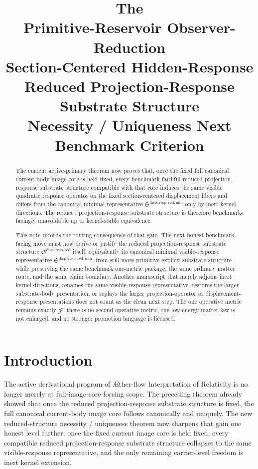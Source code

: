 \documentclass[11pt]{article}
\title{\textbf{The \TheoryName{}}\\[0.4em]
\large Primitive-Reservoir Observer-Reduction\\
\large Section-Centered Hidden-Response\\
\large Reduced Projection-Response Substrate Structure\\
\large Necessity / Uniqueness Next Benchmark Criterion}
\author{}
\date{}
\newcommand{\Aflow}{\AE{}ther-flow}
\newcommand{\TheoryName}{\Aflow{} Interpretation of Relativity}
\newcommand{\CompletedMetric}{g^{\sharp}}
\newcommand{\ReducedStructure}{\mathfrak S^{\mathrm{disp,resp,red}}}
\newcommand{\MinimalReducedStructure}{\mathfrak S^{\mathrm{disp,resp,red,min}}}
\begin{document}
\maketitle

\begin{abstract}
The current active-primary theorem now proves that, once the fixed full canonical current-body image core is held fixed, every benchmark-faithful reduced projection-response substrate structure compatible with that core induces the same visible quadratic response operator on the fixed section-centered displacement fibers and differs from the canonical minimal representative \(\MinimalReducedStructure\) only by inert kernel directions. The reduced projection-response substrate structure is therefore benchmark-facingly unavoidable up to kernel-stable equivalence.

This note records the routing consequence of that gain. The next honest benchmark-facing move must now derive or justify the reduced projection-response substrate structure \(\ReducedStructure\) itself, equivalently its canonical minimal visible-response representative \(\MinimalReducedStructure\), from still more primitive explicit substrate structure while preserving the same benchmark one-metric package, the same ordinary matter route, and the same claim boundary. Another manuscript that merely adjoins inert kernel directions, renames the same visible-response representative, restores the larger substrate-body presentation, or replays the larger projection-operator or displacement-response presentations does not count as the clean next step. The one operative metric remains exactly \(\CompletedMetric\), there is no second operative metric, the low-energy matter law is not enlarged, and no stronger promotion language is licensed.
\end{abstract}

\section{Introduction}

The active derivational program of \TheoryName{} is no longer merely at full-image-core forcing scope. The preceding theorem already showed that once the reduced projection-response substrate structure is fixed, the full canonical current-body image core follows canonically and uniquely. The new reduced-structure necessity / uniqueness theorem now sharpens that gain one honest level further: once the fixed current image core is held fixed, every compatible reduced projection-response substrate structure collapses to the same visible-response representative, and the only remaining carrier-level freedom is inert kernel extension.
\end{document}
